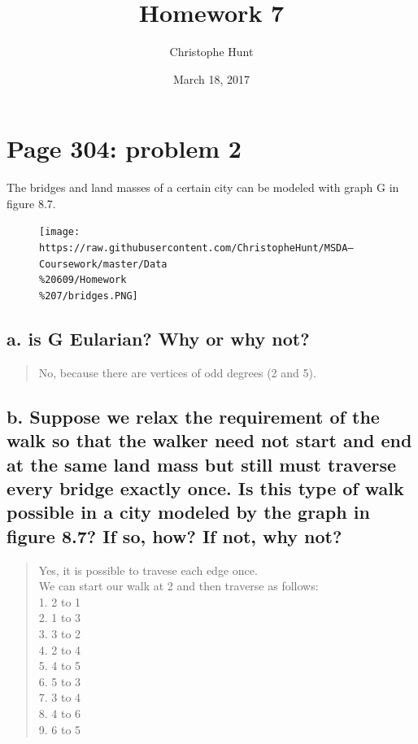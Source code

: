 \documentclass[]{article}
\title{Homework 7}
\author{Christophe Hunt}
\date{March 18, 2017}
\begin{document}
\maketitle

{
\setcounter{tocdepth}{2}
\tableofcontents
}
\newpage

\section{Page 304: problem 2}\label{page-304-problem-2}

The bridges and land masses of a certain city can be modeled with graph
G in figure 8.7.

\begin{figure}[htbp]
\centering
\texttt{[image: https://raw.githubusercontent.com/ChristopheHunt/MSDA---Coursework/master/Data\\\%20609/Homework\\\%207/bridges.PNG]}
\caption{}
\end{figure}

\subsection{a. is G Eularian? Why or why
not?}\label{a.-is-g-eularian-why-or-why-not}

\begin{quote}
No, because there are vertices of odd degrees (2 and 5).
\end{quote}

\subsection{b. Suppose we relax the requirement of the walk so that the
walker need not start and end at the same land mass but still must
traverse every bridge exactly once. Is this type of walk possible in a
city modeled by the graph in figure 8.7? If so, how? If not, why
not?}\label{b.-suppose-we-relax-the-requirement-of-the-walk-so-that-the-walker-need-not-start-and-end-at-the-same-land-mass-but-still-must-traverse-every-bridge-exactly-once.-is-this-type-of-walk-possible-in-a-city-modeled-by-the-graph-in-figure-8.7-if-so-how-if-not-why-not}

\begin{quote}
Yes, it is possible to travese each edge once.\\
We can start our walk at 2 and then traverse as follows:\\
1. 2 to 1\\
2. 1 to 3\\
3. 3 to 2\\
4. 2 to 4\\
5. 4 to 5\\
6. 5 to 3\\
7. 3 to 4\\
8. 4 to 6\\
9. 6 to 5
\end{quote}
\end{document}
